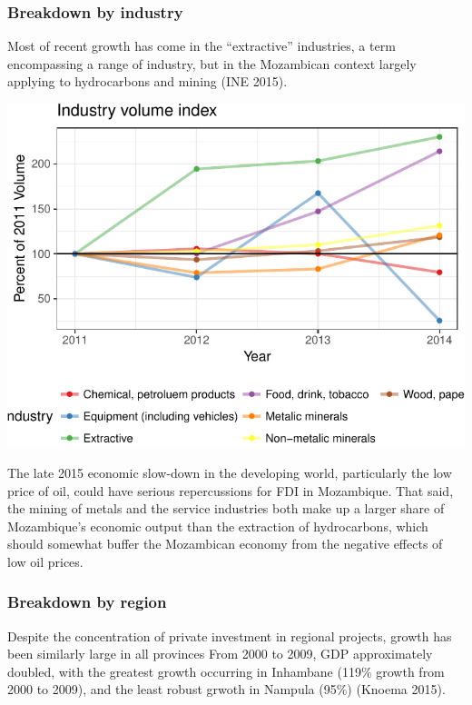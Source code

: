 \documentclass[]{article}
\begin{document}
\subsubsection{Breakdown by industry}\label{breakdown-by-industry}

Most of recent growth has come in the ``extractive'' industries, a term
encompassing a range of industry, but in the Mozambican context largely
applying to hydrocarbons and mining (INE 2015).

\begin{center}\includegraphics{figures/unnamed-chunk-12-1} \end{center}

The late 2015 economic slow-down in the developing world, particularly
the low price of oil, could have serious repercussions for FDI in
Mozambique. That said, the mining of metals and the service industries
both make up a larger share of Mozambique's economic output than the
extraction of hydrocarbons, which should somewhat buffer the Mozambican
economy from the negative effects of low oil prices.

\subsubsection{Breakdown by region}\label{breakdown-by-region}

Despite the concentration of private investment in regional projects,
growth has been similarly large in all provinces From 2000 to 2009, GDP
approximately doubled, with the greatest growth occurring in Inhambane
(119\% growth from 2000 to 2009), and the least robust grwoth in Nampula
(95\%) (Knoema 2015).
\end{document}
